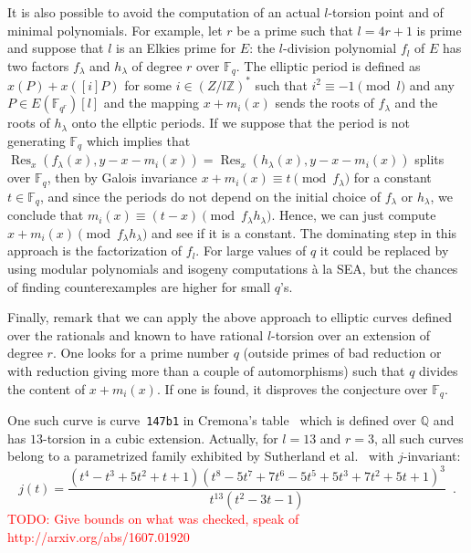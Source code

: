 \documentclass[12pt]{article}
\theoremstyle{plain}
\theoremstyle{definition}
\newcommand{\todo}[1]{\textcolor{red}{TODO: #1}}
\DeclareMathOperator{\Res}{Res}
\def\Q{\ensuremath{\mathbb{Q}}}
\def\Z{\ensuremath{\mathbb{Z}}}
\def\F{\ensuremath{\mathbb{F}}}
\begin{document}
It is also possible to avoid the computation of an actual $l$-torsion point
and of minimal polynomials.
For example, let $r$ be a prime such that $l = 4 r + 1$ is prime
and suppose that $l$ is an Elkies prime for $E$:
the $l$-division polynomial $f_l$ of $E$ has two factors
$f_\lambda$ and $h_\lambda$ of degree $r$ over $\F_{q}$.
The elliptic period is defined as $x(P) + x([i] P)$ for some
$i \in \left(Z / l \Z\right)^*$ such that $i^2 \equiv -1 \pmod{l}$
and any $P \in E(\F_{q^r})[l]$
and the mapping $x + m_i(x)$ sends the roots of $f_\lambda$
and the roots of $h_\lambda$ onto the ellptic periods.
If we suppose that the period is not generating $\F_{q}$ which implies that
$\Res_x(f_\lambda(x),y-x-m_i(x)) = \Res_x(h_\lambda(x),y-x-m_i(x))$
splits over $\F_{q}$,
then by Galois invariance $x + m_i(x) \equiv t \pmod{f_\lambda}$
for a constant $t \in \F_{q}$,
and since the periods do not depend on the initial choice of $f_\lambda$
or $h_\lambda$,
we conclude that $m_i(x) \equiv (t-x) \pmod{f_\lambda h_\lambda}$.
Hence, we can just compute $x + m_i(x) \pmod{f_\lambda h_\lambda}$
and see if it is a constant.
The dominating step in this approach is the factorization of $f_l$.
For large values of $q$ it could be replaced by using modular polynomials
and isogeny computations \`a la SEA, but the chances of finding counterexamples
are higher for small $q$'s.

Finally, remark that we can apply the above approach to elliptic curves
defined over the rationals and known to have rational $l$-torsion
over an extension of degree $r$.
One looks for a prime number $q$
(outside primes of bad reduction or
with reduction giving more than a couple of automorphisms)
such that $q$ divides the content of $x + m_i(x)$.
If one is found, it disproves the conjecture over $\F_q$.

One such curve is curve~\texttt{147b1} in Cremona's table~\cite{} which is
defined over $\Q$ and has $13$-torsion in a cubic extension.
Actually, for $l=13$ and $r=3$, all such curves belong to a parametrized family
exhibited by Sutherland et al.~\cite{} with $j$-invariant:
\[
j(t)=\frac{\left(t^4-t^3+5 t^2 + t + 1\right) \left(t^8 - 5 t^7 + 7 t^6 - 5 t^5 + 5 t^3 + 7 t^2 + 5 t + 1\right)^3}{t^{13} \left(t^2 -3 t - 1\right)} \enspace .
\]
\todo{Give bounds on what was checked, speak of http://arxiv.org/abs/1607.01920 }







\end{document}
